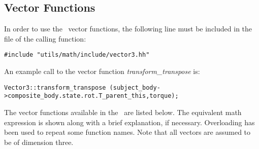 \newpage

\subsection{Vector Functions}
In order to use the \mathDesc\ vector functions, the following line must be included in the
file of the calling function:
\begin{verbatim}
#include "utils/math/include/vector3.hh"
\end{verbatim}

An example call to the vector function {\it transform\_transpose} is:
\begin{verbatim}
Vector3::transform_transpose (subject_body->composite_body.state.rot.T_parent_this,torque);
\end{verbatim}

The vector functions available in the \mathDesc\ are listed below.  The equivalent math
expression is shown along with a brief explanation, if necessary. Overloading has been used
to repeat some function names. Note that all vectors are assumed to be of dimension three. \newline\newline


